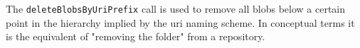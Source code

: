 The \verb+deleteBlobsByUriPrefix+ call is used to remove all blobs below a certain
point in the hierarchy implied by the uri naming scheme. In conceptual terms it is
the equivalent of "removing the folder" from a repository.

